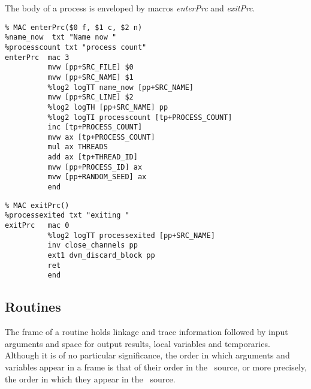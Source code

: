 The body of a process is enveloped by macros \emph{enterPrc} and \emph{exitPrc}.

\begin{tabbing}
\indents
{}
\fin
\end{tabbing}

{\small
\begin{verbatim}
% MAC enterPrc($0 f, $1 c, $2 n)
%name_now  txt "Name now "
%processcount txt "process count"
enterPrc  mac 3
          mvw [pp+SRC_FILE] $0
          mvw [pp+SRC_NAME] $1
          %log2 logTT name_now [pp+SRC_NAME]
          mvw [pp+SRC_LINE] $2
          %log2 logTH [pp+SRC_NAME] pp
          %log2 logTI processcount [tp+PROCESS_COUNT]
          inc [tp+PROCESS_COUNT]
          mvw ax [tp+PROCESS_COUNT]
          mul ax THREADS
          add ax [tp+THREAD_ID]
          mvw [pp+PROCESS_ID] ax
          mvw [pp+RANDOM_SEED] ax
          end
\end{verbatim}}

\begin{tabbing}
\indents
{}
\fin
\end{tabbing}

{\small
\begin{verbatim}
% MAC exitPrc()
%processexited txt "exiting "
exitPrc   mac 0
          %log2 logTT processexited [pp+SRC_NAME]
          inv close_channels pp
          ext1 dvm_discard_block pp
          ret
          end
\end{verbatim}}



\subsection{Routines}
The frame of a routine holds linkage and trace information followed by input arguments and space for output results, local variables and temporaries. Although it is of no particular significance, the order in which arguments and variables appear in a frame is that of their order in the \desi\ source, or more precisely, the order in which they appear in the \dil\ source.

